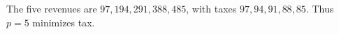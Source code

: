 The five revenues are $97,194,291,388,485$, with taxes $97,94,91,88,85$. Thus $\boxed{p=5}$ minimizes tax.
